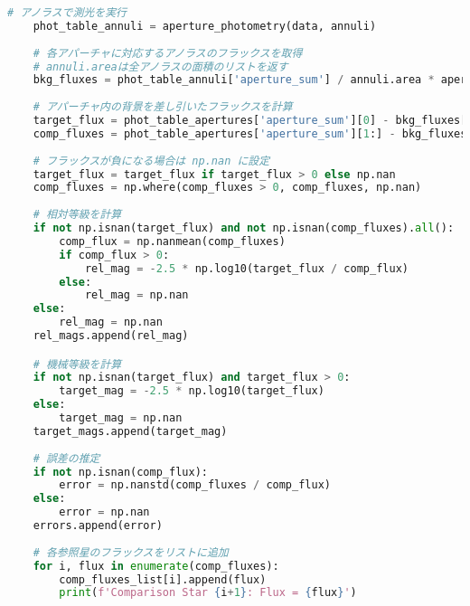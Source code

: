 \begin{lstlisting}[caption=開口測光用のコード, label=apphot, language=Python]
    # アノラスで測光を実行
    phot_table_annuli = aperture_photometry(data, annuli)
    
    # 各アパーチャに対応するアノラスのフラックスを取得
    # annuli.areaは全アノラスの面積のリストを返す
    bkg_fluxes = phot_table_annuli['aperture_sum'] / annuli.area * apertures.area
    
    # アパーチャ内の背景を差し引いたフラックスを計算
    target_flux = phot_table_apertures['aperture_sum'][0] - bkg_fluxes[0]
    comp_fluxes = phot_table_apertures['aperture_sum'][1:] - bkg_fluxes[1:]
    
    # フラックスが負になる場合は np.nan に設定
    target_flux = target_flux if target_flux > 0 else np.nan
    comp_fluxes = np.where(comp_fluxes > 0, comp_fluxes, np.nan)
    
    # 相対等級を計算
    if not np.isnan(target_flux) and not np.isnan(comp_fluxes).all():
        comp_flux = np.nanmean(comp_fluxes)
        if comp_flux > 0:
            rel_mag = -2.5 * np.log10(target_flux / comp_flux)
        else:
            rel_mag = np.nan
    else:
        rel_mag = np.nan
    rel_mags.append(rel_mag)

    # 機械等級を計算
    if not np.isnan(target_flux) and target_flux > 0:
        target_mag = -2.5 * np.log10(target_flux)
    else:
        target_mag = np.nan
    target_mags.append(target_mag)
    
    # 誤差の推定
    if not np.isnan(comp_flux):
        error = np.nanstd(comp_fluxes / comp_flux)
    else:
        error = np.nan
    errors.append(error)
    
    # 各参照星のフラックスをリストに追加
    for i, flux in enumerate(comp_fluxes):
        comp_fluxes_list[i].append(flux)
        print(f'Comparison Star {i+1}: Flux = {flux}')
\end{lstlisting}